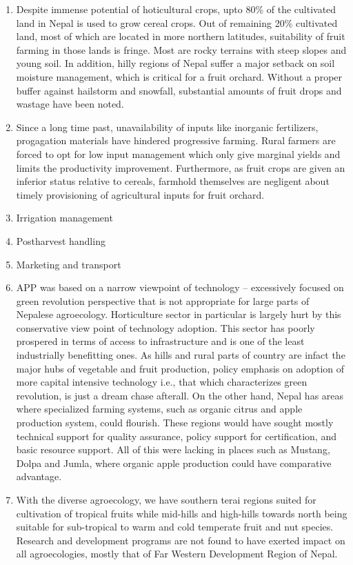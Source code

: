 \documentclass[
]{book}
\begin{document}
\begin{enumerate}
\def\labelenumi{\arabic{enumi}.}
\item
  Despite immense potential of hoticultural crops, upto 80\% of the cultivated land in Nepal is used to grow cereal crops. Out of remaining 20\% cultivated land, most of which are located in more northern latitudes, suitability of fruit farming in those lands is fringe. Most are rocky terrains with steep slopes and young soil. In addition, hilly regions of Nepal suffer a major setback on soil moisture management, which is critical for a fruit orchard. Without a proper buffer against hailstorm and snowfall, substantial amounts of fruit drops and wastage have been noted.
\item
  Since a long time past, unavailability of inputs like inorganic fertilizers, progagation materials have hindered progressive farming. Rural farmers are forced to opt for low input management which only give marginal yields and limits the productivity improvement. Furthermore, as fruit crops are given an inferior status relative to cereals, farmhold themselves are negligent about timely provisioning of agricultural inputs for fruit orchard.
\item
  Irrigation management
\item
  Postharvest handling
\item
  Marketing and transport
\item
  APP was based on a narrow viewpoint of technology -- excessively focused on green revolution perspective that is not appropriate for large parts of Nepalese agroecology. Horticulture sector in particular is largely hurt by this conservative view point of technology adoption. This sector has poorly prospered in terms of access to infrastructure and is one of the least industrially benefitting ones. As hills and rural parts of country are infact the major hubs of vegetable and fruit production, policy emphasis on adoption of more capital intensive technology i.e., that which characterizes green revolution, is just a dream chase afterall. On the other hand, Nepal has areas where specialized farming systems, such as organic citrus and apple production system, could flourish. These regions would have sought mostly technical support for quality assurance, policy support for certification, and basic resource support. All of this were lacking in places such as Mustang, Dolpa and Jumla, where organic apple production could have comparative advantage.
\item
  With the diverse agroecology, we have southern terai regions suited for cultivation of tropical fruits while mid-hills and high-hills towards north being suitable for sub-tropical to warm and cold temperate fruit and nut species. Research and development programs are not found to have exerted impact on all agroecologies, mostly that of Far Western Development Region of Nepal.

\end{enumerate}
\end{document}
